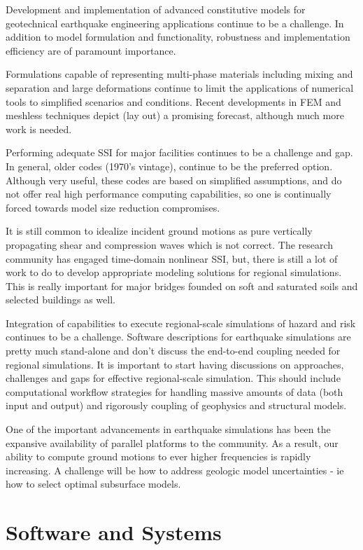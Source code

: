 Development and implementation of advanced constitutive models for geotechnical earthquake engineering applications continue to be a challenge. In addition to model formulation and functionality, robustness and implementation efficiency are of paramount importance.  

Formulations capable of representing multi-phase materials including mixing and separation and large deformations continue to limit the applications of numerical tools to simplified scenarios and conditions. Recent developments in FEM and meshless techniques depict (lay out) a promising forecast, although much more work is needed.  

Performing adequate SSI for major facilities continues to be a challenge and gap. In general, older codes (1970's vintage), continue to be the preferred option. Although very useful, these codes are based on simplified assumptions, and do not offer real high performance computing capabilities, so one is continually forced towards model size reduction compromises.

It is still common to idealize incident ground motions as pure vertically propagating shear and compression waves which is not correct. The research community has engaged time-domain nonlinear SSI, but, there is still a lot of work to do to develop appropriate modeling solutions for regional simulations. This is really important for major bridges founded on soft and saturated soils and selected buildings as well.

Integration of capabilities to execute regional-scale simulations of hazard and risk continues to be a challenge. Software descriptions for earthquake simulations are pretty much stand-alone and don't discuss the end-to-end coupling needed for regional simulations. It is important to start having discussions on approaches, challenges and gaps for effective regional-scale simulation. This should include computational workflow strategies for handling massive amounts of data (both input and output) and rigorously coupling of geophysics and structural models.

One of the important advancements in earthquake simulations has been the expansive availability of parallel platforms to the community. As a result, our ability to compute ground motions to ever higher frequencies is rapidly increasing. A challenge will be how to address geologic model uncertainties - ie how to select optimal subsurface models.


\section{Software and Systems}
\label{sec:eq_landslide_tools}

